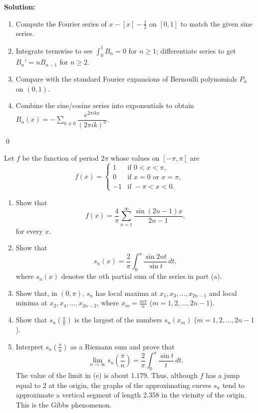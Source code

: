 \bigskip\noindent\textbf{Solution:}
\begin{enumerate}[label=(\alph*)]
\item Compute the Fourier series of $x-[x]-\tfrac12$ on $[0,1]$ to match the given sine series.
\item Integrate termwise to see $\int_0^1 B_n=0$ for $n\ge1$; differentiate series to get $B_n'=nB_{n-1}$ for $n\ge2$.
\item Compare with the standard Fourier expansions of Bernoulli polynomials $P_n$ on $(0,1)$.
\item Combine the sine/cosine series into exponentials to obtain $B_n(x)=-\sum_{k\ne0}\dfrac{e^{2\pi i k x}}{(2\pi i k)^n}$.
\end{enumerate}\qed


\begin{problembox}
Let $f$ be the function of period $2\pi$ whose values on $[-\pi, \pi]$ are
\[
f(x) = 
\begin{cases} 
1 & \text{if } 0 < x < \pi, \\
0 & \text{if } x = 0 \text{ or } x = \pi, \\
-1 & \text{if } -\pi < x < 0.
\end{cases}
\]
\begin{enumerate}[label=(\alph*)]
\item Show that
\[
f(x) = \frac{4}{\pi} \sum_{n=1}^\infty \frac{\sin (2n - 1)x}{2n - 1},
\]
for every $x$.
\item Show that
\[
s_n(x) = \frac{2}{\pi} \int_0^x \frac{\sin 2nt}{\sin t} \, dt,
\]
where $s_n(x)$ denotes the $n$th partial sum of the series in part (a).
\item Show that, in $(0, \pi)$, $s_n$ has local maxima at $x_1, x_3, \dots, x_{2n-1}$ and local minima at $x_2, x_4, \dots, x_{2n-2}$, where $x_m = \frac{m\pi}{n}$ ($m = 1, 2, \dots, 2n - 1$).
\item Show that $s_n\left(\frac{\pi}{n}\right)$ is the largest of the numbers $s_n(x_m)$ ($m = 1, 2, \dots, 2n - 1$).
\item Interpret $s_n\left(\frac{\pi}{n}\right)$ as a Riemann sum and prove that
\[
\lim_{n \to \infty} s_n\left(\frac{\pi}{n}\right) = \frac{2}{\pi} \int_0^\pi \frac{\sin t}{t} \, dt.
\]
The value of the limit in (e) is about 1.179. Thus, although $f$ has a jump equal to 2 at the origin, the graphs of the approximating curves $s_n$ tend to approximate a vertical segment of length 2.358 in the vicinity of the origin. This is the Gibbs phenomenon.
\end{enumerate}
\end{problembox}

